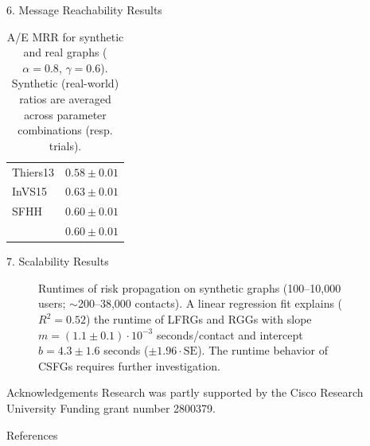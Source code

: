 \documentclass[final]{beamer}
\newlength{\sepwidth}
\newlength{\colwidth}
\newcommand{\separatorcolumn}{\begin{column}{\sepwidth}\end{column}}
\begin{document}
\begin{frame}[t]
\begin{columns}[t]
\begin{column}{\colwidth}
\begin{block}{6. Message Reachability Results}
\begin{table}
\begin{minipage}[b]{0.3\columnwidth}
\begin{tabular}{@{}lc@{}}
					Thiers13 & $0.58 \pm 0.01$\\
					InVS15 & $0.63 \pm 0.01$\\
					SFHH & $0.60 \pm 0.01$\\
					& $\boldsymbol{0.60 \pm 0.01}$\\
					\bottomrule
				\end{tabular}
				\caption{A/E MRR for synthetic and real graphs ($\alpha = 0.8$, $\gamma = 0.6$). Synthetic (real-world) ratios are averaged across parameter combinations (resp. trials).}
				\label{table:reach}
			\end{minipage}
		\end{table}
	\end{block}
	\begin{block}{7. Scalability Results}
		\begin{figure}
			\centering
			\caption{Runtimes of risk propagation on synthetic graphs (100--10,000 users; $\sim$200--38,000 contacts). A linear regression fit explains ($R^2 = 0.52$) the runtime of LFRGs and RGGs with slope $m = (1.1 \pm 0.1) \cdot 10^{-3}$ seconds/contact and intercept $b = 4.3 \pm 1.6$ seconds ($\pm 1.96 \cdot \mathrm{SE}$). The runtime behavior of CSFGs requires further investigation.}
			\label{fig:scalability}
		\end{figure}
	\end{block}
	\begin{block}{Acknowledgements}
		Research was partly supported by the Cisco Research University Funding grant number 2800379.
	\end{block}
	\begin{block}{References}
		\nocite{*}
		\scriptsize{}
	\end{block}
\end{column}
\separatorcolumn
\end{columns}
\end{frame}
\end{document}
